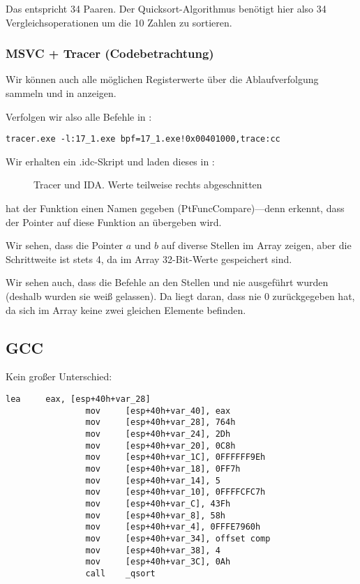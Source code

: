 Das entspricht 34 Paaren.
Der Quicksort-Algorithmus benötigt hier also 34 Vergleichsoperationen um die 10 Zahlen zu sortieren.

\clearpage
\subsubsection{MSVC + Tracer (Codebetrachtung)}
Wir können auch alle möglichen Registerwerte über die Ablaufverfolgung sammeln und in \IDA anzeigen.

Verfolgen wir also alle Befehle in \comp:

\begin{lstlisting}
tracer.exe -l:17_1.exe bpf=17_1.exe!0x00401000,trace:cc
\end{lstlisting}

Wir erhalten ein .idc-Skript und laden dieses in \IDA:

\begin{figure}[H]
\centering
{}
\caption{Tracer und IDA. Werte teilweise rechts abgeschnitten}  
\label{fig:qsort_tracer_cc}
\end{figure}
\IDA hat der Funktion einen Namen gegeben (PtFuncCompare)---denn \IDA erkennt, dass der Pointer auf diese Funktion an
\qsort übergeben wird.

Wir sehen, dass die Pointer $a$ und $b$ auf diverse Stellen im Array zeigen, aber die Schrittweite ist stets 4, da im
Array 32-Bit-Werte gespeichert sind.

Wir sehen auch, dass die Befehle an den Stellen  und  nie ausgeführt wurden (deshalb wurden
sie weiß gelassen). Da liegt daran, dass \comp nie 0 zurückgegeben hat, da sich im Array keine zwei gleichen Elemente
befinden.

\subsection{GCC}

Kein großer Unterschied:

\begin{lstlisting}[caption=GCC,style=customasmx86]
                lea     eax, [esp+40h+var_28]
                mov     [esp+40h+var_40], eax
                mov     [esp+40h+var_28], 764h
                mov     [esp+40h+var_24], 2Dh
                mov     [esp+40h+var_20], 0C8h
                mov     [esp+40h+var_1C], 0FFFFFF9Eh
                mov     [esp+40h+var_18], 0FF7h
                mov     [esp+40h+var_14], 5
                mov     [esp+40h+var_10], 0FFFFCFC7h
                mov     [esp+40h+var_C], 43Fh
                mov     [esp+40h+var_8], 58h
                mov     [esp+40h+var_4], 0FFFE7960h
                mov     [esp+40h+var_34], offset comp
                mov     [esp+40h+var_38], 4
                mov     [esp+40h+var_3C], 0Ah
                call    _qsort
\end{lstlisting}

